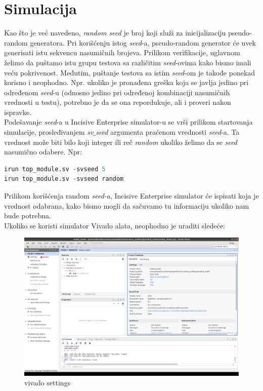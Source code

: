 
\section{Simulacija}

Kao što je već navedeno, \emph{random seed} je broj koji služi za
inicijalizaciju pseudo-random generatora. Pri korišćenju istog \emph{seed}-a,
pseudo-random generator će uvek generisati istu sekvencu nasumičnih brojeva.
Prilikom verifikacije, uglavnom želimo da puštamo istu grupu testova sa
različitim \emph{seed}-ovima kako bismo imali veću pokrivenost. Međutim,
puštanje testova sa istim \emph{seed}-om je takođe ponekad korisno i neophodno.
Npr. ukoliko je pronađena greška koja se javlja jedino pri određenom
\emph{seed}-u (odnosno jedino pri određenoj kombinaciji nasumičnih vrednosti u
testu), potrebno je da se ona repordukuje, ali i proveri nakon ispravke.\\

Podešavanje \emph{seed}-a u Incisive Enterprise simulator-u se vrši prilikom startovanja simulacije,
prosleđivanjem \emph{sv\(\_\)seed} argumenta praćenom vrednosti \emph{seed}-a.
Ta vrednost može biti bilo koji integer ili reč \emph{random} ukoliko želimo da
se \emph{seed} nasumično odabere. Npr:

\begin{lstlisting}[language=Python]
irun top_module.sv -svseed 5
irun top_module.sv -svseed random
\end{lstlisting}

Prilikom korišćenja random \emph{seed-a}, Incisive Enterprise simulator će ispisati koja je vrednost
odabrana, kako bismo mogli da sačuvamo tu informaciju ukoliko nam bude potrebna.\\

Ukoliko se koristi simulator Vivado alata, neophodno je uraditi sledeće:
\begin{figure}[h!]
  \center
  \includegraphics[width=150mm, scale=0.5]{img/v4_vivado_settings.png}
  \caption{vivado settings}
  \label{fig:vivado_settings}
\end{figure}
\newpage

